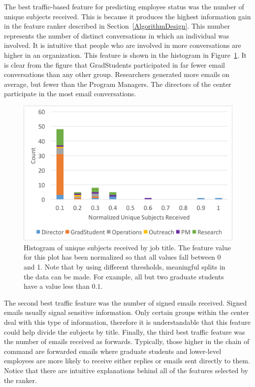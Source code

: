 \documentclass[12pt]{report}
\begin{document}
The best traffic-based feature for predicting employee status was the number of unique subjects received.
This is because it produces the highest information gain in the feature ranker described in Section~\ref{AlgorithmDesign}.
This number represents the number of distinct conversations in which an individual was involved.
It is intuitive that people who are involved in more conversations are higher in an organization.
This feature is shown in the histogram in Figure~\ref{fig:traffic_ex_hist}.
It is clear from the figure that GradStudents participated in far fewer email conversations than any other group.
Researchers generated more emails on average, but fewer than the Program Managers.
The directors of the center participate in the most email conversations. 
\begin{figure}[t]
    \centering
        \includegraphics[width=\columnwidth,trim={1mm 20mm 1mm 2mm},clip]{Unique_subjects_rec_hist}
        \caption{Histogram of unique subjects received by job title.  The feature value for this plot has been normalized so that all values fall between 0 and 1.  Note that by using different thresholds, meaningful splits in the data can be made.  For example, all but two graduate students have a value less than $0.1$.}
        \label{fig:traffic_ex_hist}
\end{figure}

The second best traffic feature was the number of signed emails received.
Signed emails usually signal sensitive information.
Only certain groups within the center deal with this type of information, therefore it is understandable that this feature could help divide the subjects by title.
Finally, the third best traffic feature was the number of emails received as forwards.
Typically, those higher in the chain of command are forwarded emails where graduate students and lower-level employees are more likely to receive either replies or emails sent directly to them.
Notice that there are intuitive explanations behind all of the features selected by the ranker.
\end{document}
